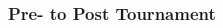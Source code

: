 \begin{CJK}{UTF8}{gbsn}
       \subsubsection{Pre- to Post Tournament\label{app8:prediction2aPrePost}}




       






\end{CJK}
